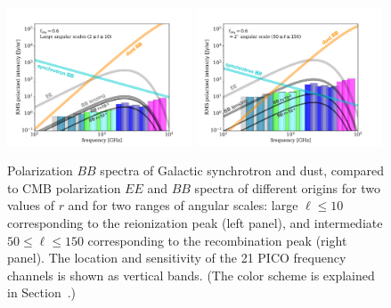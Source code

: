 \documentclass[PICOReport.tex]{subfiles}
\begin{document}
\begin{figure}
\includegraphics[width=0.49\textwidth]{images/sensitivity_vs_frequency_Jun29th_2018_large.pdf}
\includegraphics[width=0.49\textwidth]{images/sensitivity_vs_frequency_Jun29th_2018_2deg.pdf}
\vspace{-0.1in}
\caption{Polarization $BB$ spectra of Galactic synchrotron and dust, compared to CMB polarization $EE$ and $BB$ spectra of different origins for two values of $r$ and for two ranges of angular scales: large $\ell \leq 10$ corresponding to the reionization peak (left panel), and intermediate $50 \leq \ell \leq 150$ corresponding to the recombination peak (right panel). The location and sensitivity of the 21 PICO frequency channels is shown as vertical bands. (The color scheme is explained in Section~.) }
\label{fig:pico-channels-and-fg}
\end{figure}
\end{document}
